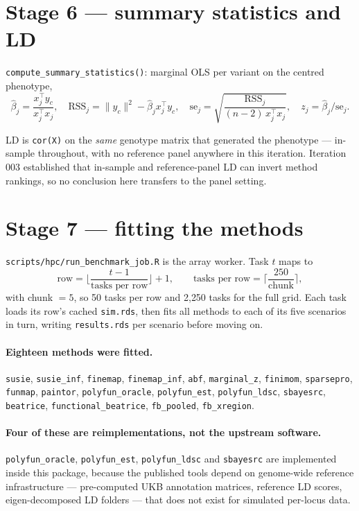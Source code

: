 \documentclass[11pt,a4paper]{article}
\newcommand{\file}[1]{\texttt{\small #1}}
\begin{document}
\section{Stage 6 --- summary statistics and LD}

\file{compute\_summary\_statistics()}: marginal OLS per variant on the centred
phenotype,
\[
\hat\beta_j=\frac{x_j^\top y_c}{x_j^\top x_j},\quad
\mathrm{RSS}_j=\|y_c\|^2-\hat\beta_j x_j^\top y_c,\quad
\mathrm{se}_j=\sqrt{\frac{\mathrm{RSS}_j}{(n-2)\,x_j^\top x_j}},\quad
z_j=\hat\beta_j/\mathrm{se}_j .
\]

LD is \texttt{cor(X)} on the \emph{same} genotype matrix that generated the
phenotype --- in-sample throughout, with no reference panel anywhere in this
iteration. Iteration 003 established that in-sample and reference-panel LD can
invert method rankings, so no conclusion here transfers to the panel setting.
\section{Stage 7 --- fitting the methods}

\file{scripts/hpc/run\_benchmark\_job.R} is the array worker. Task $t$ maps to
\[
\text{row}=\Big\lfloor\frac{t-1}{\text{tasks per row}}\Big\rfloor+1,
\qquad \text{tasks per row}=\Big\lceil\frac{250}{\text{chunk}}\Big\rceil ,
\]
with chunk $=5$, so 50 tasks per row and 2{,}250 tasks for the full grid. Each
task loads its row's cached \file{sim.rds}, then fits all methods to each of its
five scenarios in turn, writing \file{results.rds} per scenario before moving on.

\paragraph{Eighteen methods were fitted.}
\texttt{susie}, \texttt{susie\_inf}, \texttt{finemap}, \texttt{finemap\_inf},
\texttt{abf}, \texttt{marginal\_z}, \texttt{finimom}, \texttt{sparsepro},
\texttt{funmap}, \texttt{paintor}, \texttt{polyfun\_oracle},
\texttt{polyfun\_est}, \texttt{polyfun\_ldsc}, \texttt{sbayesrc},
\texttt{beatrice}, \texttt{functional\_beatrice}, \texttt{fb\_pooled},
\texttt{fb\_xregion}.

\paragraph{Four of these are reimplementations, not the upstream software.}
\texttt{polyfun\_oracle}, \texttt{polyfun\_est}, \texttt{polyfun\_ldsc} and
\texttt{sbayesrc} are implemented inside this package, because the published
tools depend on genome-wide reference infrastructure --- pre-computed UKB
annotation matrices, reference LD scores, eigen-decomposed LD folders --- that
does not exist for simulated per-locus data.
\end{document}
